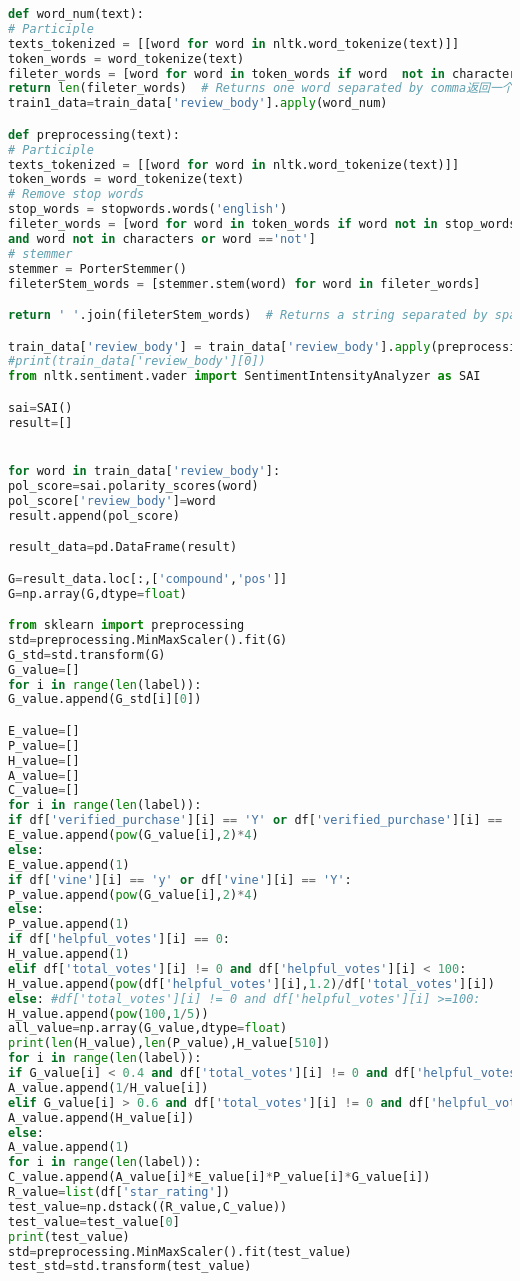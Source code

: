 \documentclass{mcmthesis}
\begin{document}
\begin{appendices}
\begin{lstlisting}[language=python]
def word_num(text):
# Participle
texts_tokenized = [[word for word in nltk.word_tokenize(text)]]
token_words = word_tokenize(text)
fileter_words = [word for word in token_words if word  not in characters ]
return len(fileter_words)  # Returns one word separated by comma返回一个个单词 逗号隔开
train1_data=train_data['review_body'].apply(word_num)

def preprocessing(text):
# Participle
texts_tokenized = [[word for word in nltk.word_tokenize(text)]]
token_words = word_tokenize(text)
# Remove stop words
stop_words = stopwords.words('english')
fileter_words = [word for word in token_words if word not in stop_words 
and word not in characters or word =='not']
# stemmer
stemmer = PorterStemmer()
fileterStem_words = [stemmer.stem(word) for word in fileter_words]

return ' '.join(fileterStem_words)  # Returns a string separated by spaces

train_data['review_body'] = train_data['review_body'].apply(preprocessing)
#print(train_data['review_body'][0])
from nltk.sentiment.vader import SentimentIntensityAnalyzer as SAI

sai=SAI()
result=[]


for word in train_data['review_body']:
pol_score=sai.polarity_scores(word)
pol_score['review_body']=word
result.append(pol_score)

result_data=pd.DataFrame(result)

G=result_data.loc[:,['compound','pos']]
G=np.array(G,dtype=float)

from sklearn import preprocessing
std=preprocessing.MinMaxScaler().fit(G)
G_std=std.transform(G)
G_value=[]
for i in range(len(label)):
G_value.append(G_std[i][0])

E_value=[]
P_value=[]
H_value=[]
A_value=[]
C_value=[]
for i in range(len(label)):
if df['verified_purchase'][i] == 'Y' or df['verified_purchase'][i] == 'y':
E_value.append(pow(G_value[i],2)*4)
else:
E_value.append(1)
if df['vine'][i] == 'y' or df['vine'][i] == 'Y':
P_value.append(pow(G_value[i],2)*4)
else:
P_value.append(1)
if df['helpful_votes'][i] == 0:
H_value.append(1)
elif df['total_votes'][i] != 0 and df['helpful_votes'][i] < 100:
H_value.append(pow(df['helpful_votes'][i],1.2)/df['total_votes'][i])
else: #df['total_votes'][i] != 0 and df['helpful_votes'][i] >=100:
H_value.append(pow(100,1/5))
all_value=np.array(G_value,dtype=float)
print(len(H_value),len(P_value),H_value[510])
for i in range(len(label)):
if G_value[i] < 0.4 and df['total_votes'][i] != 0 and df['helpful_votes'][i] != 0:
A_value.append(1/H_value[i])
elif G_value[i] > 0.6 and df['total_votes'][i] != 0 and df['helpful_votes'][i] != 0:
A_value.append(H_value[i])
else:
A_value.append(1)
for i in range(len(label)):
C_value.append(A_value[i]*E_value[i]*P_value[i]*G_value[i])
R_value=list(df['star_rating'])
test_value=np.dstack((R_value,C_value))
test_value=test_value[0]
print(test_value)
std=preprocessing.MinMaxScaler().fit(test_value)
test_std=std.transform(test_value)


\end{lstlisting}
\end{appendices}
\end{document}
